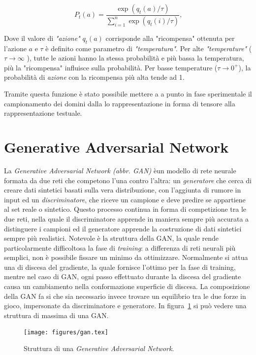 \[P_t(a) = \frac{\exp(q_t(a)/\tau)}{\sum_{i=1}^n\exp(q_t(i)/\tau)} \text{,}\]

Dove il valore di\textit{ "azione"} $q_{t}(a)$ corrisponde alla "ricompensa" ottenuta per l'azione $a$ e $\tau$  è definito come parametro di \textit{"temperatura"}. Per alte \textit{"temperature"} ( $\tau \to \infty$ ), tutte le azioni hanno la stessa probabilità e più bassa la temperatura, più la "ricompensa" influisce sulla probabilità. Per basse temperature ($\tau \to 0^{+}$), la probabilità di \textit{azione} con la ricompensa più alta tende ad 1. 

Tramite questa funzione è stato possibile mettere a a punto in fase sperimentale il campionamento dei domini dalla lo rappresentazione in forma di tensore alla rappresentazione testuale.

\newpage
\section{Generative Adversarial Network}
\label{ganintro}
La \textit{Generative Adversarial Network (abbr. GAN)} èun modello di rete neurale formata da due reti che competono l'una contro l'altra: un \textit{generatore} che cerca di creare dati sintetici basati sulla vera distribuzione, con l'aggiunta di rumore in input ed un \textit{discriminatore}, che riceve un campione e deve predire se appartiene al set reale o sintetico. Questo processo continua in forma di competizione tra le due reti, nella quale il discriminatore apprende in maniera sempre più accurata a distinguere i campioni ed il generatore apprende la costruzione di dati sintetici sempre più realistici. Notevole è la struttura della GAN, la quale rende particolarmente difficoltosa la fase di \textit{training}: a differenza di reti neurali più semplici, non è possibile fissare un minimo da ottimizzare. Normalmente si attua una di discesa del gradiente, la quale fornisce l'ottimo per la fase di training, mentre nel caso di GAN, ogni passo effettuato durante la discesa del gradiente causa un cambiamento nella conformazione superficie di discesa. La composizione della GAN fa si che sia necessario invece trovare un equilibrio tra le due forze in gioco, impersonate da discriminatore e generatore. In figura~\ref{fig:gan} si può vedere una struttura di massima di una GAN.

\begin{figure}[!bp]
    \centering
	\texttt{[image: figures/gan.tex]}
	\caption{Struttura di una \textit{Generative Adversarial Network}.
\label{fig:gan}}
\end{figure}


